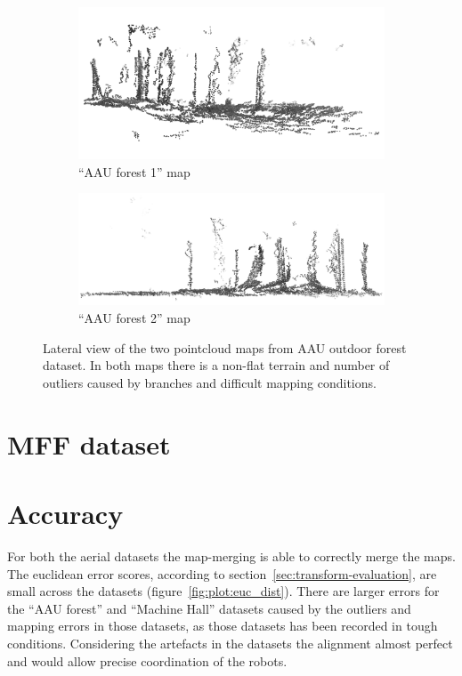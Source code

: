 \begin{figure}
    \centering
    \begin{subfigure}[b]{\textwidth}
        \includegraphics[width=\textwidth]{../img/aau_fc_dnav5_lateral.png}
        \caption{``\gls{AAU} forest 1'' map}
    \end{subfigure}
    \begin{subfigure}[b]{\textwidth}
        \includegraphics[width=\textwidth]{../img/aau_fc_dnav6_lateral.png}
        \caption{``\gls{AAU} forest 2'' map}
    \end{subfigure}
    \caption[Forest pointcloud maps -- lateral view]{Lateral view of the two pointcloud maps from \gls{AAU} outdoor forest dataset. In both maps there is a non-flat terrain and number of outliers caused by branches and difficult mapping conditions.}
    \label{fig:aau_lateral}
\end{figure}

\section{MFF dataset}
\label{sec:mff-dataset}

\section{Accuracy}

For both the aerial datasets the map-merging is able to correctly merge the maps. The euclidean error scores, according to section~\ref{sec:transform-evaluation}, are small across the datasets (figure~\ref{fig:plot:euc_dist}). There are larger errors for the ``AAU forest'' and ``Machine Hall'' datasets caused by the outliers and mapping errors in those datasets, as those datasets has been recorded in tough conditions. Considering the artefacts in the datasets the alignment almost perfect and would allow precise coordination of the robots.

